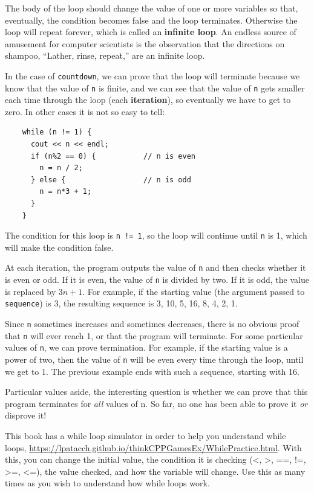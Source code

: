 
The body of the loop should change the value of
one or more variables so that, eventually, the condition becomes
false and the loop terminates.  Otherwise the loop will repeat
forever, which is called an {\bf infinite loop}.  An endless
source of amusement for computer scientists is the observation
that the directions on shampoo, ``Lather, rinse, repeat,'' are
an infinite loop.

In the case of {\tt countdown}, we can prove that the loop
will terminate because we know that the value of {\tt n} is
finite, and we can see that the value of {\tt n} gets smaller
each time through the loop (each {\bf iteration}), so
eventually we have to get to zero.  In other cases it is not
so easy to tell:

\begin{verbatim}
    while (n != 1) {
      cout << n << endl;
      if (n%2 == 0) {           // n is even
        n = n / 2;
      } else {                  // n is odd
        n = n*3 + 1;
      }
    }

\end{verbatim}
%
The condition for this loop is {\tt n != 1}, so the loop
will continue until {\tt n} is 1, which will make the condition
false.

At each iteration, the program outputs the value of {\tt n} and then
checks whether it is even or odd.  If it is even, the value of
{\tt n} is divided by two.  If it is odd, the value is replaced
by $3n+1$.  For example, if the starting value (the argument passed
to {\tt sequence}) is 3, the resulting sequence is
3, 10, 5, 16, 8, 4, 2, 1.

Since {\tt n} sometimes increases and sometimes decreases, there is no
obvious proof that {\tt n} will ever reach 1, or that the program will
terminate.  For some particular values of {\tt n}, we can prove
termination.  For example, if the starting value is a power of two, then
the value of {\tt n} will be even every time through the loop, until
we get to 1.  The previous example ends with such a sequence,
starting with 16.

Particular values aside, the interesting question is whether
we can prove that this program terminates for {\em all} values of n.
So far, no one has been able to prove it {\em or} disprove it!

This book has a while loop simulator in order to help you understand while loops, \url{https://lpatacch.github.io/thinkCPPGamesEx/WhilePractice.html}. 
With this, you can change the 
initial value, the condition it is checking (\textless, \textgreater, ==, !=, \textgreater=, \textless=), the value checked,
and how the variable will change. Use this as many times as you wish
to understand how while loops work.
